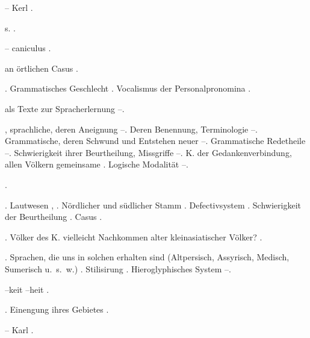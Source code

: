 \begin{register}
 – Kerl \pageref{sp.230}.

 s. .

 – caniculus \pageref{sp.435}.

  an örtlichen Casus \pageref{sp.462}.

. Grammatisches Geschlecht \pageref{sp.390}. Vocalismus der Personalpronomina \pageref{sp.409}.

 als Texte zur Spracherlernung \pageref{sp.73}–\pageref{sp.75}.

, sprachliche, deren Aneignung \pageref{sp.63}–\pageref{sp.64}. Deren Benennung, Terminologie \pageref{sp.114}–\pageref{sp.116}. Grammatische, deren Schwund und Entstehen neuer \pageref{sp.253}–\pageref{sp.255}. Grammatische Redetheile \pageref{sp.381}–\pageref{sp.385}. Schwierigkeit ihrer Beurtheilung, Missgriffe \pageref{sp.405}–\pageref{sp.408}. K. der Gedankenverbindung, allen Völkern gemeinsame \pageref{sp.464}. Logische Modalität \pageref{sp.470}–\pageref{sp.472}.

 \pageref{sp.257}.


. Lautwesen \pageref{sp.34}, \pageref{sp.197}. Nördlicher und südlicher Stamm \pageref{sp.142}. Defectivsystem \pageref{sp.352}. Schwierigkeit der Beurtheilung \pageref{sp.426}.  Casus \pageref{sp.463}.

. Völker des K. vielleicht Nachkommen alter kleinasiatischer Völker? \pageref{sp.146}.

.  Sprachen, die uns in solchen erhalten sind (Altpersisch, Assyrisch, Medisch, Sumerisch u.~s.~w.) \pageref{sp.114}. Stilisirung \pageref{sp.129}. Hieroglyphisches System \pageref{sp.130}–\pageref{sp.131}.

–keit –heit \pageref{sp.216}.

. Einengung ihres Gebietes \pageref{sp.146}. 



 – Karl \pageref{sp.230}.


\end{register}
